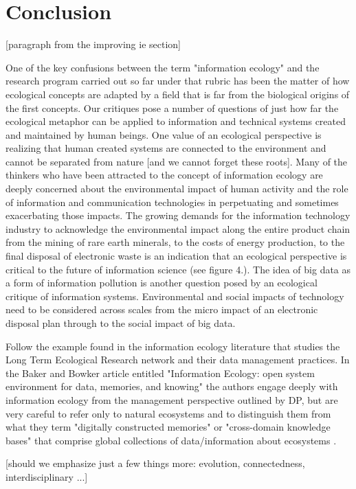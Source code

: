 \section{Conclusion}

[paragraph from the improving ie section]

One of the key confusions between the term "information ecology" and the research program carried out so far under that rubric has been the matter of how ecological concepts are adapted by a field that is far from the biological origins of the first concepts. Our critiques pose a number of questions of just how far the ecological metaphor can be applied to information and technical systems created and maintained by human beings. One value of an ecological perspective is realizing that human created systems are connected to the environment and cannot be separated from nature [and we cannot forget these roots]. Many of the thinkers who have been attracted to the concept of information ecology are deeply concerned about the environmental impact of human activity and the role of information and communication technologies in perpetuating and sometimes exacerbating those impacts. The growing demands for the information technology industry to acknowledge the environmental impact along the entire product chain from the mining of rare earth minerals, to the costs of energy production, to the final disposal of electronic waste is an indication that an ecological perspective is critical to the future of information science (see figure 4.). The idea of big data as a form of information pollution is another question posed by an ecological critique of information systems. Environmental and social impacts of technology need to be considered across scales from the micro impact of an electronic disposal plan through to the social impact of big data.

Follow the example found in the information ecology literature that studies the Long Term Ecological Research network and their data management practices. In the Baker and Bowker article entitled "Information Ecology: open system environment for data, memories, and knowing" the authors engage deeply with information ecology from the management perspective outlined by DP, but are very careful to refer only to natural ecosystems and to distinguish them from what they term "digitally constructed memories" or "cross-domain knowledge bases" that comprise global collections of data/information about ecosystems \citep[][p. 131]{baker_2007}.

[should we emphasize just a few things more: evolution, connectedness, interdisciplinary ...]

